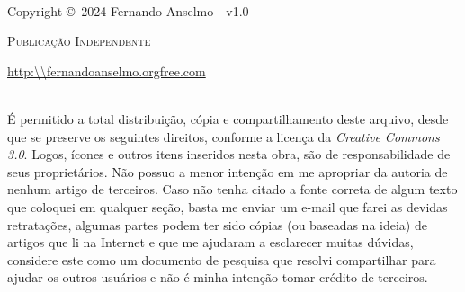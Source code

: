 \documentclass[a4paper,11pt]{book} %
\begin{document}
\begingroup
\thispagestyle{empty}
\vfill
\endgroup

\newpage
~\vfill
\thispagestyle{empty}

\noindent Copyright \copyright\ 2024 Fernando Anselmo - v1.0 %

\noindent \textsc{Publicação Independente} %

\noindent \url{http:\\fernandoanselmo.orgfree.com} %

\noindent \\ É permitido a total distribuição, cópia e compartilhamento deste arquivo, desde que se preserve os seguintes direitos, conforme a licença da \textit{Creative Commons 3.0}. Logos, ícones e outros itens inseridos nesta obra, são de responsabilidade de seus proprietários. Não possuo a menor intenção em me apropriar da autoria de nenhum artigo de terceiros. Caso não tenha citado a fonte correta de algum texto que coloquei em qualquer seção, basta me enviar um e-mail que farei as devidas retratações, algumas partes podem ter sido cópias (ou baseadas na ideia) de artigos que li na Internet e que me ajudaram a esclarecer muitas dúvidas, considere este como um documento de pesquisa que resolvi compartilhar para ajudar os outros usuários e não é minha intenção tomar crédito de terceiros. %


\end{document}
